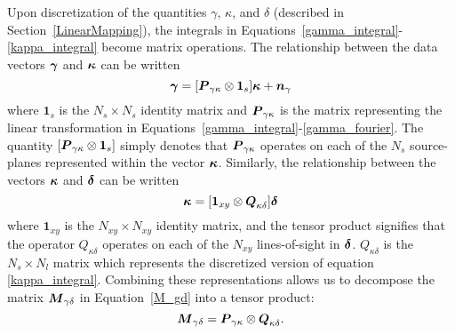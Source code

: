 Upon discretization of the quantities $\gamma$, $\kappa$, and $\delta$
(described in Section~\ref{LinearMapping}), 
the integrals in Equations~\ref{gamma_integral}-\ref{kappa_integral} 
become matrix operations.  The relationship between the data vectors
$\boldsymbol{\gamma}$ and $\boldsymbol{\kappa}$ can be written
\begin{equation}
  \label{P_gk}
  \boldsymbol{\gamma} = [\boldsymbol{P}_{\gamma\kappa} \otimes \mathbf{1}_s]\boldsymbol{\kappa} 
  + \boldsymbol{n}_\gamma
\end{equation}
where $\mathbf{1}_s$ is the $N_s \times N_s$ identity matrix and 
$\boldsymbol{P}_{\gamma\kappa}$ is the matrix representing the linear 
transformation in Equations~\ref{gamma_integral}-\ref{gamma_fourier}.  
The quantity $[\boldsymbol{P}_{\gamma\kappa} \otimes \mathbf{1}_s]$ 
simply denotes that $\boldsymbol{P}_{\gamma\kappa}$ operates on each of the $N_s$ 
source-planes represented within the vector $\boldsymbol{\kappa}$.
Similarly, the relationship between the vectors $\boldsymbol{\kappa}$ and
$\boldsymbol{\delta}$ can be written
\begin{equation}
  \label{Q_kd}
  \boldsymbol{\kappa} = [\mathbf{1}_{xy} \otimes \boldsymbol{Q}_{\kappa\delta}]\boldsymbol{\delta}
\end{equation}
where $\mathbf{1}_{xy}$ is the $N_{xy} \times N_{xy}$ 
identity matrix, and the tensor product signifies that the operator 
$Q_{\kappa\delta}$ operates on each of the $N_{xy}$ lines-of-sight in
$\boldsymbol{\delta}$.  $Q_{\kappa\delta}$ is the $N_s \times N_l$ matrix which
represents the discretized version of equation \ref{kappa_integral}.
Combining these representations allows us to decompose the matrix 
$\boldsymbol{M}_{\gamma\delta}$ in Equation~\ref{M_gd} into a tensor product:
\begin{equation}
  \boldsymbol{M}_{\gamma\delta} = 
  \boldsymbol{P}_{\gamma\kappa} \otimes \boldsymbol{Q}_{\kappa\delta}.
\end{equation}

